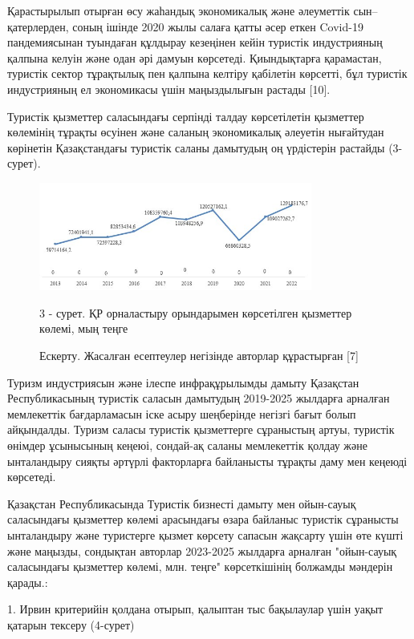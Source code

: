 \begin{multicols}{2}
Қарастырылып отырған өсу жаһандық экономикалық және әлеуметтік
сын--қатерлерден, соның ішінде 2020 жылы салаға қатты әсер еткен
Covid-19 пандемиясынан туындаған құлдырау кезеңінен кейін туристік
индустрияның қалпына келуін және одан әрі дамуын көрсетеді. Қиындықтарға
қарамастан, туристік сектор тұрақтылық пен қалпына келтіру қабілетін
көрсетті, бұл туристік индустрияның ел экономикасы үшін маңыздылығын
растады {[}10{]}.

Туристік қызметтер саласындағы серпінді талдау көрсетілетін қызметтер
көлемінің тұрақты өсуінен және саланың экономикалық әлеуетін нығайтудан
көрінетін Қазақстандағы туристік саланы дамытудың оң үрдістерін растайды
(3-сурет).
\end{multicols}

\begin{figure}[H]
	\centering
	\includegraphics[width=0.8\textwidth]{media/ekon/image6.3}
	\caption*{3 - сурет. ҚР орналастыру орындарымен көрсетілген қызметтер
  көлемі, мың теңге}
  \caption*{Ескерту. Жасалған есептеулер негізінде авторлар құрастырған {[}7{]}}
\end{figure}

\begin{multicols}{2}
Туризм индустриясын және ілеспе инфрақұрылымды дамыту Қазақстан
Республикасының туристік саласын дамытудың 2019-2025 жылдарға арналған
мемлекеттік бағдарламасын іске асыру шеңберінде негізгі бағыт болып
айқындалды. Туризм саласы туристік қызметтерге сұраныстың артуы,
туристік өнімдер ұсынысының кеңеюі, сондай-ақ саланы мемлекеттік қолдау
және ынталандыру сияқты әртүрлі факторларға байланысты тұрақты даму мен
кеңеюді көрсетеді.

Қазақстан Республикасында Туристік бизнесті дамыту мен ойын-сауық
саласындағы қызметтер көлемі арасындағы өзара байланыс туристік
сұранысты ынталандыру және туристерге қызмет көрсету сапасын жақсарту
үшін өте күшті және маңызды, сондықтан авторлар 2023-2025 жылдарға
арналған "ойын-сауық саласындағы қызметтер көлемі, млн. теңге"
көрсеткішінің болжамды мәндерін қарады.:

1. Ирвин критерийін қолдана отырып, қалыптан тыс бақылаулар үшін уақыт
қатарын тексеру (4-сурет)
\end{multicols}

